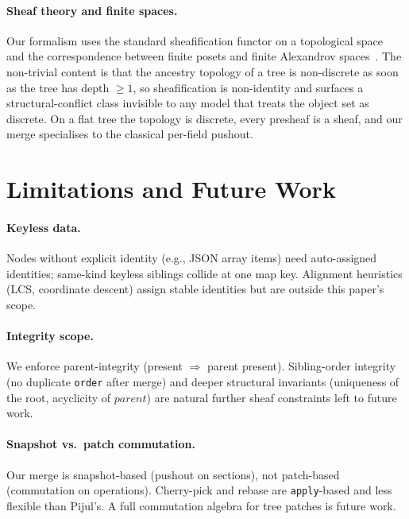 \documentclass[11pt,a4paper]{article}
\begin{document}
\paragraph{Sheaf theory and finite spaces.} Our formalism uses the standard
sheafification functor on a topological space~\cite{godement} and the
correspondence between finite posets and finite Alexandrov
spaces~\cite{mccord, barmak}. The non-trivial content is that the ancestry
topology of a tree is non-discrete as soon as the tree has depth $\geq 1$, so
sheafification is non-identity and surfaces a structural-conflict class
invisible to any model that treats the object set as discrete. On a flat tree
the topology is discrete, every presheaf is a sheaf, and our merge
specialises to the classical per-field pushout.


\section{Limitations and Future Work}

\paragraph{Keyless data.} Nodes without explicit identity (e.g., JSON
array items) need auto-assigned identities; same-kind keyless siblings
collide at one map key. Alignment heuristics (LCS, coordinate descent)
assign stable identities but are outside this paper's scope.

\paragraph{Integrity scope.} We enforce parent-integrity (present $\Rightarrow$
parent present). Sibling-order integrity (no duplicate \texttt{order} after
merge) and deeper structural invariants (uniqueness of the root, acyclicity
of $parent$) are natural further sheaf constraints left to future work.

\paragraph{Snapshot vs.\ patch commutation.} Our merge is snapshot-based
(pushout on sections), not patch-based (commutation on operations).
Cherry-pick and rebase are \texttt{apply}-based and less flexible than
Pijul's. A full commutation algebra for tree patches is future work.
\end{document}
